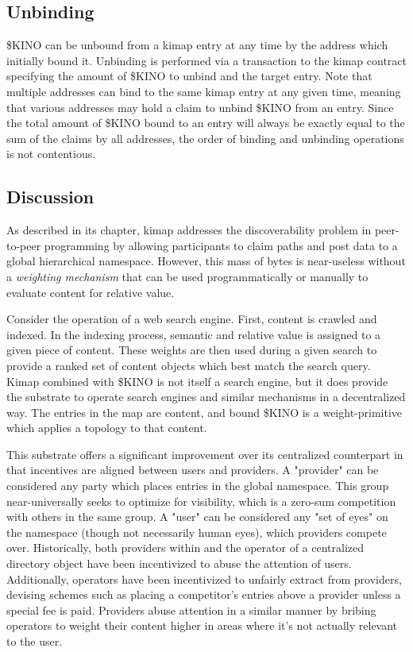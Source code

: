 \documentclass[runningheads]{llncs}
\begin{document}
\subsection{Unbinding}

\$KINO can be unbound from a kimap entry at any time by the address which initially bound it.
Unbinding is performed via a transaction to the kimap contract specifying the amount of \$KINO to unbind and the target entry.
Note that multiple addresses can bind to the same kimap entry at any given time, meaning that various addresses may hold a claim to unbind \$KINO from an entry. Since the total amount of \$KINO bound to an entry will always be exactly equal to the sum of the claims by all addresses, the order of binding and unbinding operations is not contentious.

\subsection{Discussion}

As described in its chapter, kimap addresses the discoverability problem in peer-to-peer programming by allowing participants to claim paths and post data to a global hierarchical namespace.
However, this mass of bytes is near-useless without a \textit{weighting mechanism} that can be used programmatically or manually to evaluate content for relative value.

Consider the operation of a web search engine.
First, content is crawled and indexed.
In the indexing process, semantic and relative value is assigned to a given piece of content.
These weights are then used during a given search to provide a ranked set of content objects which best match the search query.
Kimap combined with \$KINO is not itself a search engine, but it does provide the substrate to operate search engines and similar mechanisms in a decentralized way.
The entries in the map are content, and bound \$KINO is a weight-primitive which applies a topology to that content.

This substrate offers a significant improvement over its centralized counterpart in that incentives are aligned between users and providers.
A "provider" can be considered any party which places entries in the global namespace.
This group near-universally seeks to optimize for visibility, which is a zero-sum competition with others in the same group.
A "user" can be considered any "set of eyes" on the namespace (though not necessarily human eyes), which providers compete over.
Historically, both providers within and the operator of a centralized directory object have been incentivized to abuse the attention of users.
Additionally, operators have been incentivized to unfairly extract from providers, devising schemes such as placing a competitor's entries above a provider unless a special fee is paid.
Providers abuse attention in a similar manner by bribing operators to weight their content higher in areas where it's not actually relevant to the user.
\end{document}
